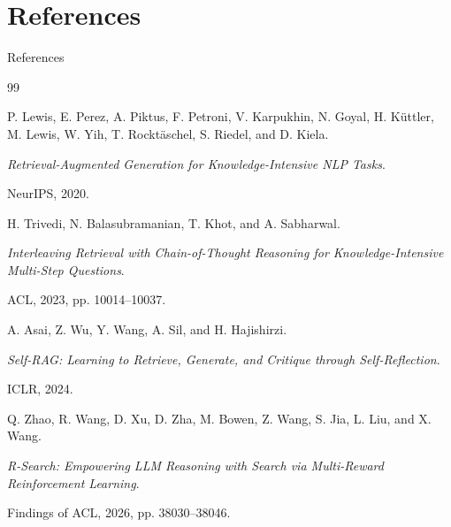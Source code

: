 
\section{References}

\begin{frame}{References}

\footnotesize

\begin{thebibliography}{99}

P. Lewis, E. Perez, A. Piktus, F. Petroni, V. Karpukhin,
N. Goyal, H. Küttler, M. Lewis, W. Yih, T. Rocktäschel,
S. Riedel, and D. Kiela.

\textit{Retrieval-Augmented Generation for Knowledge-Intensive NLP Tasks}.

NeurIPS, 2020.

\vspace{0.15cm}

H. Trivedi, N. Balasubramanian, T. Khot, and A. Sabharwal.

\textit{Interleaving Retrieval with Chain-of-Thought Reasoning
for Knowledge-Intensive Multi-Step Questions}.

ACL, 2023, pp. 10014--10037.

\vspace{0.15cm}

A. Asai, Z. Wu, Y. Wang, A. Sil, and H. Hajishirzi.

\textit{Self-RAG: Learning to Retrieve, Generate, and Critique
through Self-Reflection}.

ICLR, 2024.

\vspace{0.15cm}

Q. Zhao, R. Wang, D. Xu, D. Zha, M. Bowen, Z. Wang,
S. Jia, L. Liu, and X. Wang.

\textit{R-Search: Empowering LLM Reasoning with Search
via Multi-Reward Reinforcement Learning}.

Findings of ACL, 2026, pp. 38030--38046.

\end{thebibliography}

\end{frame}